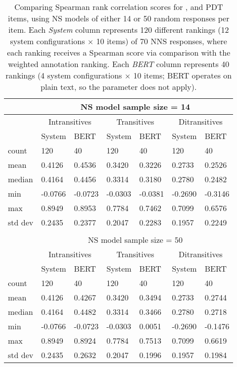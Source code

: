 \begin{table}[htb!]
\begin{center}
\begin{tabular}{|l||l|l||l|l||l|l|}
\hline
 & \multicolumn{6}{c|}{NS model sample size = 14} \\
\hline
 & \multicolumn{2}{c||}{Intransitives} & \multicolumn{2}{c||}{Transitives} & \multicolumn{2}{c|}{Ditransitives} \\
\hline
		& System 	& BERT 		& System 	& BERT 		& System 	& BERT 		\\
\hline
\hline
count 	& 120 		& 40 		& 120 		& 40 		& 120 		& 40		 \\
\hline
mean 	& 0.4126 	& 0.4536 	& 0.3420 	& 0.3226	& 0.2733 	& 0.2526	 \\
\hline
median 	& 0.4164 	& 0.4456 	& 0.3314 	& 0.3180	& 0.2780 	& 0.2482	 \\
\hline
min 	& -0.0766 	& -0.0723 	& -0.0303 	& -0.0381	& -0.2690 	& -0.3146	 \\
\hline
max 	& 0.8949 	& 0.8953	& 0.7784 	& 0.7462	& 0.7099 	& 0.6576	 \\
\hline
std dev & 0.2435 	& 0.2377	& 0.2047 	& 0.2283	& 0.1957 	& 0.2249	 \\
\hline
\multicolumn{7}{c}{} \\
\hline
 & \multicolumn{6}{c|}{NS model sample size = 50} \\
\hline
 & \multicolumn{2}{c||}{Intransitives} & \multicolumn{2}{c||}{Transitives} & \multicolumn{2}{c|}{Ditransitives} \\
\hline
		& System 	& BERT 			& System 	& BERT 			& System 	& BERT \\
\hline
\hline
count 	& 120 		& 40 			& 120 		& 40 			& 120 		& 40 	\\
\hline
mean 	& 0.4126 	& 0.4267 		& 0.3420 	& 0.3494	 	& 0.2733 	& 0.2744 \\
\hline
median 	& 0.4164 	& 0.4482	 	& 0.3314 	& 0.3466	 	& 0.2780 	& 0.2718 \\
\hline
min 	& -0.0766 	& -0.0723	 	& -0.0303 	& 0.0051	 	& -0.2690 	& -0.1476 \\
\hline
max 	& 0.8949 	& 0.8924	 	& 0.7784 	& 0.7513	 	& 0.7099 	& 0.6619 \\
\hline
std dev & 0.2435 	& 0.2632 		& 0.2047 	& 0.1996 		& 0.1957 	& 0.1984 \\
\hline
\end{tabular}
\caption{\label{tab:transitivity-results} Comparing Spearman rank correlation scores for ,  and  PDT items, using NS models of either 14 or 50 random responses per item. Each \textit{System} column represents 120 different rankings (12 system configurations $\times$ 10 items) of 70 NNS responses, where each ranking receives a Spearman score via comparison with the weighted annotation ranking. Each \textit{BERT} column represents 40 rankings (4 system configurations $\times$ 10 items; BERT operates on plain text, so the  parameter does not apply).}
\end{center}
\end{table}

